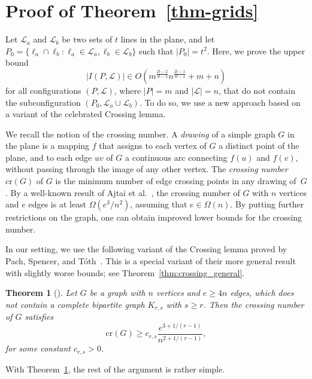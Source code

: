 \documentclass{article}
\newtheorem{theorem}{Theorem}
\begin{document}
\section{Proof of Theorem~\ref{thm-grids}}

Let $\mathcal{L}_a$ and $\mathcal{L}_b$ be two sets of $t$ lines in the plane, and let $P_0=\{\ell_a\cap \ell_b : \ell_a\in \mathcal{L}_a, \ell_b\in \mathcal{L}_b\}$ such that $|P_0|=t^2$.
Here, we prove the upper bound 
\[|I(P,\mathcal{L})| \in O(m^{\frac{2t-2}{3t-2}} n^{\frac{2t-1}{3t-2}}+m+n)\] 
for all configurations $(P,\mathcal{L})$, where $|P|=m$ and $|\mathcal{L}|=n$, that do not contain the subconfiguration $(P_0,\mathcal{L}_a\cup \mathcal{L}_b)$.
To do so, we use a new approach based on a variant of the celebrated Crossing lemma.
 
We recall the notion of the crossing number. 
A \emph{drawing} of a simple graph $G$ in the plane is a mapping $f$ that assigns to each vertex of $G$ a distinct point of the plane, and to each edge $uv$ of $G$ a continuous arc connecting $f(u)$ and $f(v)$, without passing through the image of any other vertex. 
The \emph{crossing number} $\textrm{cr}(G)$ of $G$ is the minimum number of edge crossing points in any drawing of~$G$. 
By a well-known result of Ajtai et al.~\cite{ACNS}, the crossing number of $G$ with $n$ vertices and $e$ edges is at least $\Omega(e^3/n^2)$, assuming that $e\in \Omega(n)$. 
By putting further restrictions on the graph, one can obtain improved lower bounds for the crossing number.

In our setting, we use the following variant of the Crossing lemma proved by Pach, Spencer, and T\'{o}th~\cite{pachspencertoth}. 
This is a special variant of their more general result with slightly worse bounds; see Theorem~\ref{thm:crossing_general}.

\begin{theorem}[\cite{pachspencertoth}]
\label{thm:crossing}
Let $G$ be a graph with $n$ vertices and $e\geq 4n$ edges, which does not contain a complete bipartite graph $K_{r,s}$ with $s \geq r$. Then the crossing number of $G$ satisfies \[\textrm{cr}(G)\geq c_{r,s}\frac{e^{3+1/(r-1)}}{n^{2+1/(r-1)}},\] for some constant $c_{r,s}>0$.
\end{theorem}




With Theorem~\ref{thm:crossing}, the rest of the argument is rather simple.
\end{document}
